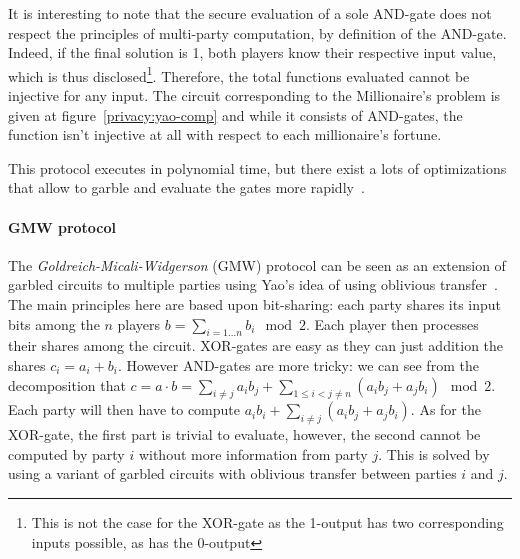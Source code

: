 It is interesting to note that the secure evaluation of a sole AND-gate does not respect the principles of multi-party computation, by definition of the AND-gate. Indeed, if the final solution is 1, both players know their respective input value, which is thus disclosed\footnote{This is not the case for the XOR-gate as the 1-output has two corresponding inputs possible, as has the 0-output}. Therefore, the total functions evaluated cannot be injective for any input. The circuit corresponding to the Millionaire's problem is given at figure~\ref{privacy:yao-comp} and while it consists of AND-gates, the function isn't injective at all with respect to each millionaire's fortune.

This protocol executes in polynomial time, but there exist a lots of optimizations that allow to garble and evaluate the gates more rapidly~\cite{YakoubovAContents}.

\paragraph{GMW protocol}
The \emph{Goldreich-Micali-Widgerson} (GMW) protocol can be seen as an extension of garbled circuits to multiple parties using Yao's idea of using oblivious transfer~\cite{Goldreich1987HowGame}. The main principles here are based upon bit-sharing: each party shares its input bits among the $n$ players $b = \sum_{i=1\ldots n}b_i \mod 2$. Each player then processes their shares among the circuit. XOR-gates are easy as they can just addition the shares $c_i = a_i + b_i$. However AND-gates are more tricky: we can see from the decomposition that $c = a \cdot b = \sum_{i\neq j}a_ib_j+\sum_{1\leq i< j\neq n}\left(a_ib_j + a_jb_i \right) \mod 2$. Each party will then have to compute $a_ib_i+ \sum_{i\neq j}\left( a_ib_j + a_jb_i\right)$. As for the XOR-gate, the first part is trivial to evaluate, however, the second cannot be computed by party $i$ without more information from party $j$. This is solved by using a variant of garbled circuits with oblivious transfer between parties $i$ and $j$.

